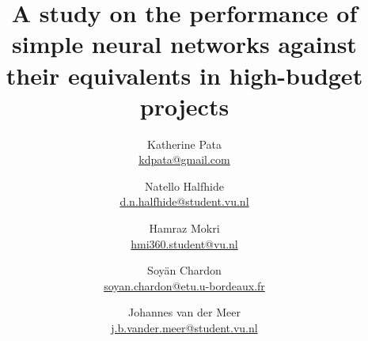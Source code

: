 \documentclass[11pt, a4paper]{article}
\begin{document}
\title{A study on the performance of simple neural networks against their equivalents in high-budget projects}
\author{
  Katherine Pata \\ \href{mailto:kdpata@gmail.com}{kdpata@gmail.com}
  \and Natello Halfhide \\ \href{mailto:d.n.halfhide@student.vu.nl}{d.n.halfhide@student.vu.nl}
  \and Hamraz Mokri \\ \href{mailto:hmi360.student@vu.nl}{hmi360.student@vu.nl}
  \and Soyän Chardon \\ \href{mailto:soyan.chardon@etu.u-bordeaux.fr}{soyan.chardon@etu.u-bordeaux.fr}
  \and Johannes van der Meer \\ \href{mailto:j.b.vander.meer@student.vu.nl}{j.b.vander.meer@student.vu.nl}
}
\maketitle

\newpage

\tableofcontents

\newpage
\restoregeometry

\twocolumn










\newpage
\onecolumn
\appendix
\end{document}
